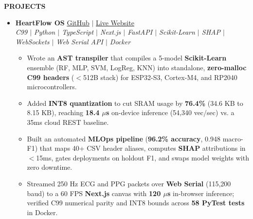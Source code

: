 \documentclass[10pt]{article}
\newcommand{\resheading}[1]{{\small \colorbox{mygrey}{\begin{minipage}{\dimexpr\textwidth-2\fboxsep\relax}\textbf{#1 \vphantom{p\^{E}}}\end{minipage}}}}
\begin{document}
\noindent
\resheading{PROJECTS}
\begin{itemize}[leftmargin=*]\small
\item \textbf{HeartFlow OS} \hfill \href{https://github.com/rachit-mangawa/HEARTFLOW_OS}{GitHub} $|$ \href{https://rachit-mangawa.github.io/HEARTFLOW_OS}{Live Website} 
\\
\textit{\footnotesize C99 $|$ Python $|$ TypeScript $|$ Next.js $|$ FastAPI $|$ Scikit-Learn $|$ SHAP $|$ WebSockets $|$ Web Serial API $|$ Docker}
\begin{itemize}[noitemsep, leftmargin=*]\footnotesize
\item Wrote an \textbf{AST transpiler} that compiles a 5-model \textbf{Scikit-Learn} ensemble (RF, MLP, SVM, LogReg, KNN) into standalone, \textbf{zero-malloc C99 headers} ($<$512B stack) for ESP32-S3, Cortex-M4, and RP2040 microcontrollers.
\item Added \textbf{INT8 quantization} to cut SRAM usage by \textbf{76.4\%} (34.6 KB to 8.15 KB), reaching \textbf{18.4 $\mu$s} on-device inference (54,340 vec/sec) vs. a 35ms cloud REST baseline.
\item Built an automated \textbf{MLOps pipeline} (\textbf{96.2\% accuracy}, 0.948 macro-F1) that maps 40+ CSV header aliases, computes \textbf{SHAP} attributions in $<$15ms, gates deployments on holdout F1, and swaps model weights with zero downtime.
\item Streamed 250 Hz ECG and PPG packets over \textbf{Web Serial} (115,200 baud) to a 60 FPS \textbf{Next.js} canvas with \textbf{120 $\mu$s} in-browser inference; verified C99 numerical parity and INT8 bounds across \textbf{58 PyTest tests} in Docker.
\end{itemize}


\end{itemize}
\end{document}
